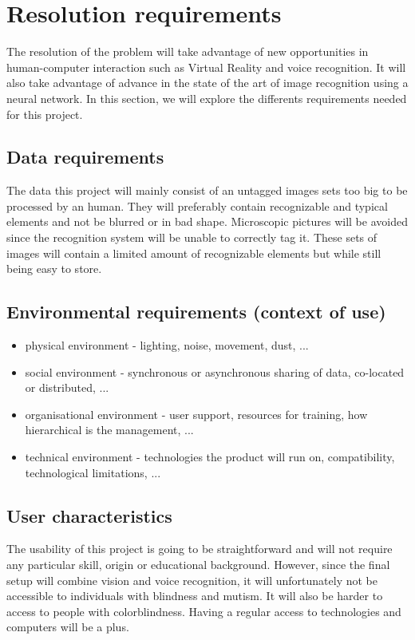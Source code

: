\documentclass[11pt,a4paper]{article}
\begin{document}
\section{Resolution requirements}

The resolution of the problem will take advantage of new opportunities in human-computer interaction such as Virtual Reality and voice recognition. It will also take advantage of advance in the state of the art of image recognition using a neural network. In this section, we will explore the differents requirements needed for this project.

\subsection{Data requirements\todo{}}

The data this project will mainly consist of an untagged images sets too big to be processed by an human. They will preferably contain recognizable and typical elements and not be blurred or in bad shape. Microscopic pictures will be avoided since the recognition system will be unable to correctly tag it. These sets of images will contain a limited amount of recognizable elements but while still being easy to store. 

\subsection{Environmental requirements (context of use)\todo{}}

\begin{itemize}
\item physical environment
- lighting, noise, movement, dust, ...
\item social environment
- synchronous or asynchronous sharing of data, co-located or distributed, ...
\item organisational environment
- user support, resources for training, how hierarchical is the management, ...
\item technical environment
- technologies the product will run on, compatibility, technological limitations, ...
\end{itemize}

\subsection{User characteristics\todo{}}

The usability of this project is going to be straightforward and will not require any particular skill, origin or educational background. However, since the final setup will combine vision and voice recognition, it will unfortunately not be accessible to individuals with blindness and mutism. It will also be harder to access to people with colorblindness. Having a regular access to technologies and computers will be a plus.
\end{document}
